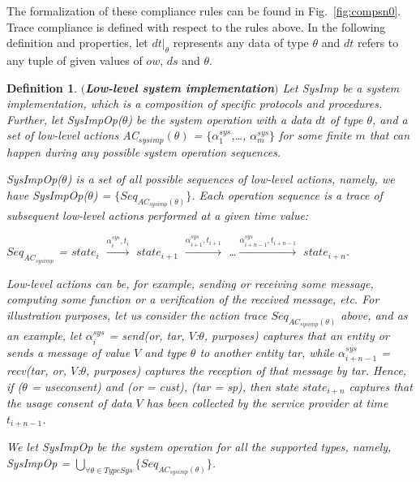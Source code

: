 \documentclass[a4paper]{article}
\newtheorem{ttd}{Definition}
\begin{document}
The formalization of these compliance rules can be found in Fig.~\ref{fig:compsn0}. Trace compliance is defined with respect to the rules above. In the following definition and properties, let $dt|_{\theta}$ represents any data of type $\theta$ and $dt$ refers to any tuple of given values of $ow$, $ds$ and $\theta$. 

\begin{ttd}\label{def:sysimp}
$($\textbf{\emph{Low-level system implementation}}$)$ \noindent Let \textit{SysImp} be a system implementation, which is  a composition of  specific protocols and procedures. Further, let  
\textit{SysImpOp}($\theta$) be the system operation with a data $dt$ of type $\theta$, and a set of low-level actions \textit{AC}$_{\textit{sysimp}}(\theta)$ = $\{$$\alpha^{sys}_1$,\dots, $\alpha^{sys}_m$$\}$ for some finite $m$ that can happen during any possible system operation sequences.


\textit{SysImpOp}($\theta$) is a set of all possible  sequences of low-level actions, namely, we have \textit{SysImpOp}($\theta$) = $\{$$\textit{Seq}_{\textit{AC}_{\textit{sysimp}}(\theta)}$$\}$. Each operation sequence is a trace of subsequent low-level actions performed at a given time value: 

\begin{center}
$\textit{Seq}_{\textit{AC}_{\textit{sysimp}}}$ = $\textit{state}_i$ $\stackrel{\alpha^{sys}_i, t_i}{\longrightarrow}$ $\textit{state}_{i+1}$ $\stackrel{\alpha^{sys}_{i+1}, t_{i+1}}{\longrightarrow}$ \dots $\stackrel{\alpha^{sys}_{i+n-1}, t_{i+n-1}}{\longrightarrow}$ $\textit{state}_{i+n}$.    
\end{center}

Low-level actions can be, for example, sending or receiving some message, computing some function or a verification of the received message, etc. For illustration purposes, let us consider the action trace $\textit{Seq}_{\textit{AC}_{\textit{sysimp}}(\theta)}$ above, and as an example, let $\alpha^{sys}_i$ = \textit{send}(\textit{or}, \textit{tar}, $V$:$\theta$, \textit{purposes}) captures that an entity \textit{or} sends a message of value $V$ and type $\theta$ to another entity \textit{tar}, while $\alpha^{sys}_{i+n-1}$ = \textit{recv}(\textit{tar}, \textit{or}, $V$:$\theta$, \textit{purposes}) captures the reception of that message by \textit{tar}. Hence, if ($\theta$ = useconsent) and (\textit{or} = \textit{cust}), (\textit{tar} = \textit{sp}), then state $\textit{state}_{i+n}$ captures  that 
the usage consent of data $V$ has been collected by the service provider at time $t_{i+n-1}$.  

We let \textit{SysImpOp} be the system operation for all the supported types, namely, \textit{SysImpOp} = $\bigcup_{\forall \theta \in \textit{TypeSys}}\{\textit{Seq}_{\textit{AC}_{\textit{sysimp}}(\theta)}\}$. 
\end{ttd}
\end{document}

